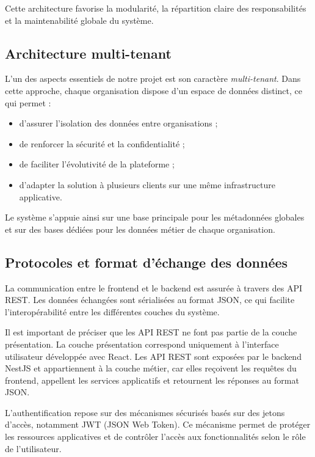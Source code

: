 \documentclass[12pt,a4paper,twoside,openany]{book}
\begin{document}
Cette architecture favorise la modularité, la répartition claire des responsabilités et la maintenabilité globale du système.

\subsection{Architecture multi-tenant}

L’un des aspects essentiels de notre projet est son caractère \textit{multi-tenant}. Dans cette approche, chaque organisation dispose d’un espace de données distinct, ce qui permet :

\begin{itemize}
    \item d’assurer l’isolation des données entre organisations ;
    \item de renforcer la sécurité et la confidentialité ;
    \item de faciliter l’évolutivité de la plateforme ;
    \item d’adapter la solution à plusieurs clients sur une même infrastructure applicative.
\end{itemize}

Le système s’appuie ainsi sur une base principale pour les métadonnées globales et sur des bases dédiées pour les données métier de chaque organisation.

\subsection{Protocoles et format d’échange des données}

La communication entre le frontend et le backend est assurée à travers des API REST. Les données échangées sont sérialisées au format JSON, ce qui facilite l’interopérabilité entre les différentes couches du système.

Il est important de préciser que les API REST ne font pas partie de la couche présentation. La couche présentation correspond uniquement à l’interface utilisateur développée avec React. Les API REST sont exposées par le backend NestJS et appartiennent à la couche métier, car elles reçoivent les requêtes du frontend, appellent les services applicatifs et retournent les réponses au format JSON.

L’authentification repose sur des mécanismes sécurisés basés sur des jetons d’accès, notamment JWT (JSON Web Token). Ce mécanisme permet de protéger les ressources applicatives et de contrôler l’accès aux fonctionnalités selon le rôle de l’utilisateur.
\end{document}
